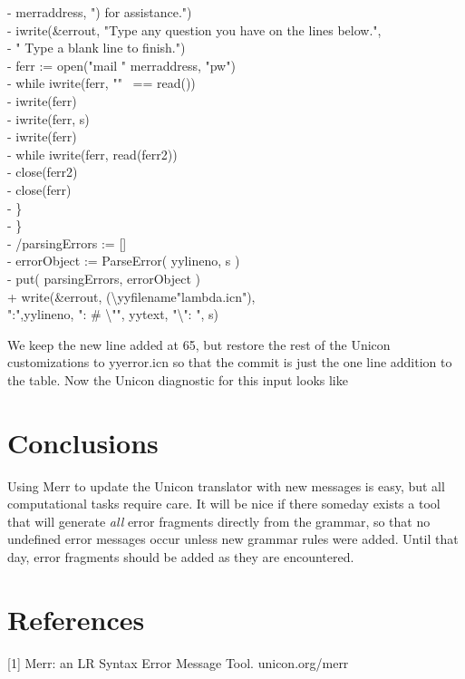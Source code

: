 \documentclass[letterpaper]{article}
\begin{document}
{-	       merraddress, ") for assistance.")\\
-	 iwrite(\&errout, "Type any question you have on the lines below.",\\
-	       " Type a blank line to finish.")\\
-	 ferr := open("mail " {\textbar}{\textbar} merraddress, "pw")\\
-	 while iwrite(ferr, "" ~== read())\\
-	 iwrite(ferr)\\
-	 iwrite(ferr, s)\\
-	 iwrite(ferr)\\
-	 while iwrite(ferr, read(ferr2))\\
-	 close(ferr2)\\
-	 close(ferr)\\
-         \}\\
-      \}\\
-   /parsingErrors := []\\
-   errorObject := ParseError( yylineno, s )\\
-   put( parsingErrors, errorObject )\\
+   write(\&errout, (\textbackslash yyfilename{\textbar}"lambda.icn"),\\
":",yylineno, ": \# \textbackslash "", yytext, "\textbackslash ": ", s)
}

We keep the new line added at 65, but restore the rest of the Unicon
customizations to yyerror.icn so that the commit is just the one line
addition to the table.  Now the Unicon diagnostic for this input
looks like



\section{Conclusions}

Using Merr to update the Unicon translator with new messages is
easy, but all computational tasks require care. It will be nice if there
someday exists a tool that will generate {\em all\/} error fragments
directly from the grammar, so that no undefined error messages occur
unless new grammar rules were added. Until that day, error fragments
should be added as they are encountered.

\section*{References}

[1] Merr: an LR Syntax Error Message Tool. unicon.org/merr
\end{document}
